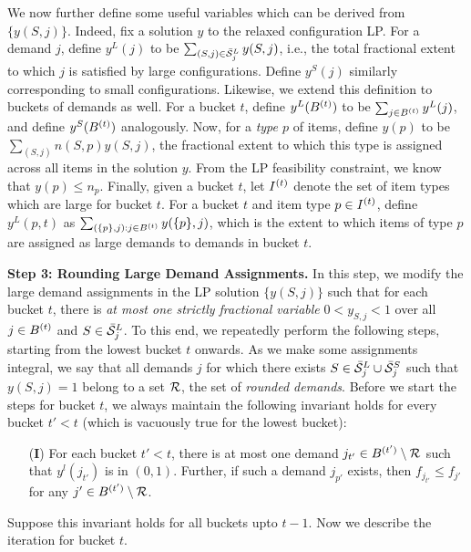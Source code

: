 We now further define some useful variables which can be derived from $\{y(S,j)\}$. Indeed, fix a solution $y$ to the relaxed configuration LP. For a demand $j$, define $y^L(j)$ to be $\sum_{(S,j) \in \bar{\cal S}^L_j} y(S,j)$, i.e., the total fractional extent to which $j$ is satisfied by large configurations. Define $y^S(j)$ similarly corresponding to small configurations. Likewise, we extend this definition to buckets of demands as well. For a bucket $t$, define $y^L(B^{(t)})$ to be $\sum_{j \in B^{(t)}} y^L(j)$, and define $y^S(B^{(t)})$ analogously. Now, for a \emph{type $p$} of items, define $y(p)$ to be $\sum_{(S,j)} n(S,p) y(S,j)$, the fractional extent to which this type is assigned across all items in the solution $y$. From the LP feasibility constraint, we know that $y(p) \leq n_p$. Finally, given a bucket $t$, let $I^{(t)}$ denote the set of item types which are large for bucket $t$. For a bucket $t$ and item type $p \in I^{(t)}$, define $y^L(p,t)$ as $\sum_{(\{p\}, j): j \in B^{(t)}} y(\{p\}, j)$, which is the extent to which items of type $p$ are assigned as large demands to demands in bucket $t$.

\medskip \noindent
{\bf Step 3: Rounding Large Demand Assignments.} In this step, we modify the large demand assignments in the LP solution $\{y(S,j)\}$ such that for each bucket $t$, there is \emph{at most one strictly fractional variable} $0 < y_{S,j} < 1$ over all $j \in B^{(t)}$ and $S \in \bar{\cal S}^L_j$. To this end, we repeatedly perform the following steps, starting from the lowest bucket $t$ onwards. As we make some assignments integral, we say that all demands $j$ for which there exists $S \in \bar{\cal S}^L_j \cup \bar{\cal S}^S_j$ such that $y(S,j)=1$ belong to a set ${\cal R}$, the set of \emph{rounded demands}. Before we start the steps for bucket $t$, we always maintain the following invariant holds for every bucket $t' < t$ (which is vacuously true for the lowest bucket):
\begin{framed}
\begin{itemize}
\item[({\bf I})] For each bucket $t' < t$, there is at most one  demand $j_{t'} \in B^{(t')} \setminus {\cal R}$ such that $y^l(j_{t'})$ is in $(0,1)$. Further, if such a demand $j_{p'}$ exists, then $f_{j_{t'}} \leq f_{j'}$ for any $j' \in B^{(t')} \setminus {\cal R}$.
\end{itemize}
\end{framed}

Suppose this invariant holds for all buckets upto $t-1$. Now we describe the iteration for bucket $t$.

